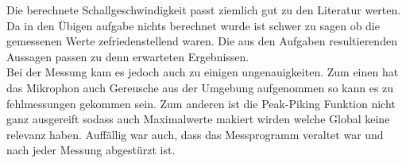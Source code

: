 Die berechnete Schallgeschwindigkeit passt ziemlich gut zu den Literatur werten.
Da in den Übigen aufgabe nichts berechnet wurde ist schwer zu sagen ob die gemessenen Werte zefriedenstellend waren.
Die aus den Aufgaben resultierenden Aussagen passen zu denn erwarteten Ergebnissen.\\
Bei der Messung kam es jedoch auch zu einigen ungenauigkeiten.
Zum einen hat das Mikrophon auch Gereusche aus der Umgebung aufgenommen so kann es zu fehlmessungen gekommen sein.
Zum anderen ist die Peak-Piking Funktion nicht ganz ausgereift sodass auch Maximalwerte makiert wirden welche Global keine relevanz haben.
Auffällig war auch, dass das Messprogramm veraltet war und nach jeder Messung abgestürzt ist.
